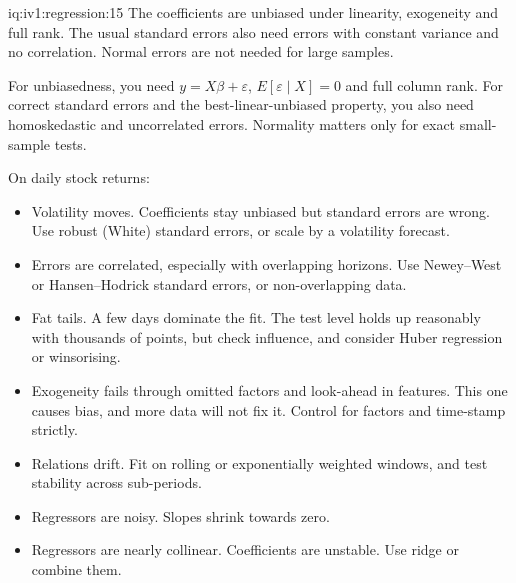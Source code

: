 \enlargethispage{-3\baselineskip}%
\begin{solution}{iq:iv1:regression:15}
The coefficients are unbiased under linearity, exogeneity and full rank. The usual standard errors also need errors with constant variance and no correlation. Normal errors are not needed for large samples.

For unbiasedness, you need $y = X\beta + \varepsilon$, $E[\varepsilon \mid X] = 0$ and full column rank. For correct standard errors and the best-linear-unbiased property, you also need homoskedastic and uncorrelated errors. Normality matters only for exact small-sample tests.

On daily stock returns:
\begin{itemize}[leftmargin=*,itemsep=1pt,topsep=2pt]
\item Volatility moves. Coefficients stay unbiased but standard errors are wrong. Use robust (White) standard errors, or scale by a volatility forecast.
\item Errors are correlated, especially with overlapping horizons. Use Newey--West or Hansen--Hodrick standard errors, or non-overlapping data.
\item Fat tails. A few days dominate the fit. The test level holds up reasonably with thousands of points, but check influence, and consider Huber regression or winsorising.
\item Exogeneity fails through omitted factors and look-ahead in features. This one causes bias, and more data will not fix it. Control for factors and time-stamp strictly.
\item Relations drift. Fit on rolling or exponentially weighted windows, and test stability across sub-periods.
\item Regressors are noisy. Slopes shrink towards zero.
\item Regressors are nearly collinear. Coefficients are unstable. Use ridge or combine them.
\end{itemize}

\end{solution}

